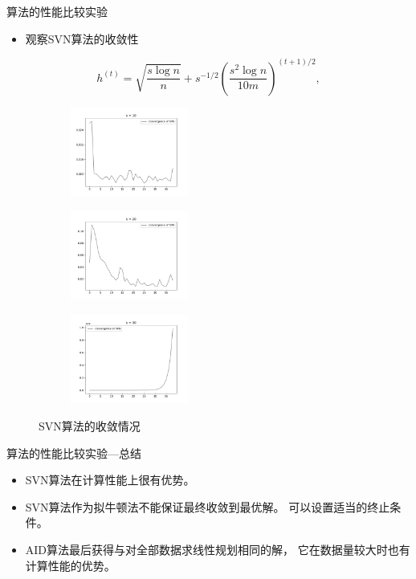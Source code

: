 \begin{frame}{算法的性能比较实验}
    \begin{itemize}
        \item 观察SVN算法的收敛性
    \end{itemize}
    $$
    h^{(t)} = \sqrt{\frac{s\log n}{n}} + s^{-1/2} (\frac{s^2\log n}{10m})^{(t+1)/2},
    $$
    \begin{figure}[H]
        \centering
        \begin{subfigure}[t]{0.3\textwidth}\label{svn-demo1}
        \includegraphics[width=3.9cm]{pics/svn-con-1.pdf}
        \end{subfigure}
        \begin{subfigure}[t]{0.3\textwidth}\label{svn-demo2}
        \includegraphics[width=3.9cm]{pics/svn-con-2.pdf}
        \end{subfigure}
        \begin{subfigure}[t]{0.3\textwidth}\label{svn-demo3}
        \includegraphics[width=3.9cm]{pics/svn-con-3.pdf}
        \end{subfigure}
        \caption{ \small SVN算法的收敛情况}
        \label{svn-demo}
    \end{figure}
\end{frame}

\begin{frame}{算法的性能比较实验—总结}
    \begin{itemize}
        \item SVN算法在计算性能上很有优势。 
        \item SVN算法作为拟牛顿法不能保证最终收敛到最优解。
        可以设置适当的终止条件。
        \item AID算法最后获得与对全部数据求线性规划相同的解，
        它在数据量较大时也有计算性能的优势。
    \end{itemize}
\end{frame}

